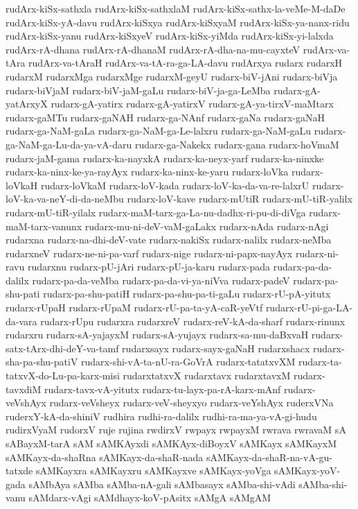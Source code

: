 {rudArx-kiSx-sathxla
rudArx-kiSx-sathxlaM
rudArx-kiSx-sathx-la-veMe-M-daDe
rudArx-kiSx-yA-davu
rudArx-kiSxya
rudArx-kiSxyaM
rudArx-kiSx-ya-nanx-ridu
rudArx-kiSx-yanu
rudArx-kiSxyeV
rudArx-kiSx-yiMda
rudArx-kiSx-yi-lalxda
rudArx-rA-dhana
rudArx-rA-dhanaM
rudArx-rA-dha-na-mu-cayxteV
rudArx-va-tAra
rudArx-va-tAraH
rudArx-va-tA-ra-ga-LA-davu
rudArxya
rudarx
rudarxH
rudarxM
rudarxMga
rudarxMge
rudarxM-geyU
rudarx-biV-jAni
rudarx-biVja
rudarx-biVjaM
rudarx-biV-jaM-gaLu
rudarx-biV-ja-ga-LeMba
rudarx-gA-yatArxyX
rudarx-gA-yatirx
rudarx-gA-yatirxV
rudarx-gA-ya-tirxV-maMtarx
rudarx-gaMTu
rudarx-gaNAH
rudarx-ga-NAnf
rudarx-gaNa
rudarx-gaNaH
rudarx-ga-NaM-gaLa
rudarx-ga-NaM-ga-Le-lalxru
rudarx-ga-NaM-gaLu
rudarx-ga-NaM-ga-Lu-da-ya-vA-daru
rudarx-ga-Nakekx
rudarx-gana
rudarx-hoVmaM
rudarx-jaM-gama
rudarx-ka-nayxkA
rudarx-ka-neyx-yarf
rudarx-ka-ninxke
rudarx-ka-ninx-ke-ya-rayAyx
rudarx-ka-ninx-ke-yaru
rudarx-loVka
rudarx-loVkaH
rudarx-loVkaM
rudarx-loV-kada
rudarx-loV-ka-da-va-re-lalxrU
rudarx-loV-ka-va-neY-di-da-neMbu
rudarx-loV-kave
rudarx-mUtiR
rudarx-mU-tiR-yalilx
rudarx-mU-tiR-yilalx
rudarx-maM-tarx-ga-La-nu-dadhx-ri-pu-di-diVga
rudarx-maM-tarx-vanunx
rudarx-mu-ni-deV-vaM-gaLakx
rudarx-nAda
rudarx-nAgi
rudarxna
rudarx-na-dhi-deV-vate
rudarx-nakiSx
rudarx-nalilx
rudarx-neMba
rudarxneV
rudarx-ne-ni-pa-varf
rudarx-nige
rudarx-ni-papx-nayAyx
rudarx-ni-ravu
rudarxnu
rudarx-pU-jAri
rudarx-pU-ja-karu
rudarx-pada
rudarx-pa-da-dalilx
rudarx-pa-da-veMba
rudarx-pa-da-vi-ya-niVva
rudarx-padeV
rudarx-pa-shu-pati
rudarx-pa-shu-patiH
rudarx-pa-shu-pa-ti-gaLu
rudarx-rU-pA-yitutx
rudarx-rUpaH
rudarx-rUpaM
rudarx-rU-pa-ta-yA-caR-yeVtf
rudarx-rU-pi-ga-LA-da-vara
rudarx-rUpu
rudarxra
rudarxreV
rudarx-reV-kA-da-sharf
rudarx-rinunx
rudarxru
rudarx-sA-yajayxM
rudarx-sA-yujayx
rudarx-sa-mu-daBxvaH
rudarx-satx-tArx-dhi-deY-va-tamf
rudarxsayx
rudarx-sayx-gaNaH
rudarxshacx
rudarx-sha-pa-shu-patiV
rudarx-shi-vA-ta-nU-ra-GoVrA
rudarx-tatatxvXM
rudarx-ta-tatxvX-do-Lu-pa-karx-misi
rudarxtatxvX
rudarxtavx
rudarxtavxM
rudarx-tavxdiM
rudarx-tavx-vA-yitutx
rudarx-tu-layx-pa-rA-karx-mAnf
rudarx-veVshAyx
rudarx-veVsheyx
rudarx-veV-sheyxyo
rudarx-veYshAyx
ruderxVNa
ruderxY-kA-da-shiniV
rudhira
rudhi-ra-dalilx
rudhi-ra-ma-ya-vA-gi-hudu
rudirxVyaM
rudorxV
ruje
rujina
rwdirxV
rwpayx
rwpayxM
rwrava
rwravaM
sA
sABayxM-tarA
sAM
sAMKAyxdi
sAMKAyx-diBoyxV
sAMKayx
sAMKayxM
sAMKayx-da-shaRna
sAMKayx-da-shaR-nada
sAMKayx-da-shaR-na-vA-gu-tatxde
sAMKayxra
sAMKayxru
sAMKayxve
sAMKayx-yoVga
sAMKayx-yoV-gada
sAMbAya
sAMba
sAMba-nA-gali
sAMbasayx
sAMba-shi-vAdi
sAMba-shi-vanu
sAMdarx-vAgi
sAMdhayx-koV-pAsitx
sAMgA
sAMgAM
}
